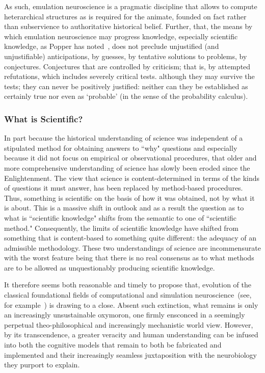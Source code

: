 \documentclass[10pt,letterpaper]{article}
\begin{document}
As such, emulation neuroscience is a pragmatic discipline that allows to compute heterarchical structures as is required for the animate, founded on fact rather than subservience to authoritative historical belief.  Further, that, the means by which emulation neuroscience may progress knowledge, especially scientific knowledge, as Popper has noted~\cite{popper62}, does not preclude unjustified (and unjustifiable) anticipations, by guesses, by tentative solutions to problems, by conjectures. Conjectures that are controlled by criticism; that is, by attempted refutations, which includes severely critical tests. although they may survive the tests; they can never be positively justified: neither can they be established as certainly true nor even as `probable' (in the sense of the probability calculus).

\subsubsection*{What is Scientific?}
In part because the historical understanding of science was independent of a stipulated method for obtaining answers to ``why" questions and especially because it did not focus on empirical or observational procedures, that older and more comprehensive understanding of science has slowly been eroded since the Enlightenment. The view that science is content-determined in terms of the kinds of questions it must answer, has been replaced by method-based procedures. Thus, something is scientific on the basis of how it was obtained, not by what it is about. This is a massive shift in outlook and as a result the question as to what is ``scientific knowledge" shifts from the semantic to one of ``scientific method." Consequently, the limits of scientific knowledge have shifted from something that is content-based to something quite different: the adequacy of an admissible methodology. These two understandings of science are incommensurate with the worst feature being that there is no real consensus as to what methods are to be allowed as unquestionably producing scientific knowledge.

It therefore seems both reasonable and timely to propose that, evolution of the classical foundational fields of computational and simulation neuroscience~(see, for example~\cite{fan19,swanson15,swanson10}) is drawing to a close. Absent such extinction, what remains is only an increasingly unsustainable oxymoron, one firmly ensconced in a seemingly perpetual theo-philosophical and increasingly mechanistic world view. However, by its transcendence, a greater veracity and human understanding can be infused into both the cognitive models that remain to both be fabricated and implemented and their increasingly seamless juxtaposition with the neurobiology they purport to explain. %
\end{document}
